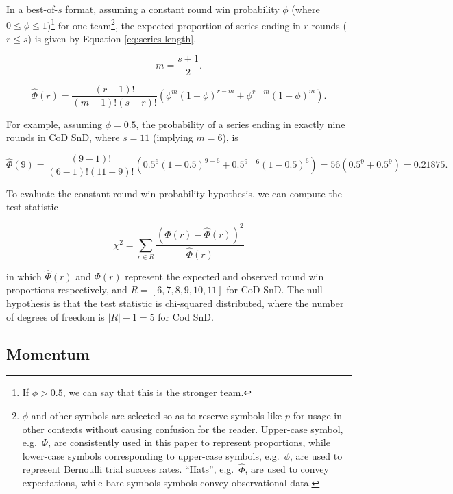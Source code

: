 \documentclass{article}
\begin{document}
In a best-of-\(s\) format, assuming a constant round win probability
\(\phi\) (where \(0 \leq \phi \leq 1\))\footnote{If \(\phi > 0.5\), we
  can say that this is the stronger team.} for one team\footnote{\(\phi\)
  and other symbols are selected so as to reserve symbols like \(p\) for
  usage in other contexts without causing confusion for the reader.
  Upper-case symbol, e.g.~\(\Phi\), are consistently used in this paper
  to represent proportions, while lower-case symbols corresponding to
  upper-case symbols, e.g.~\(\phi\), are used to represent Bernoulli
  trial success rates. ``Hats'', e.g.~\(\hat{\Phi}\), are used to convey
  expectations, while bare symbols symbols convey observational data.},
the expected proportion of series ending in \(r\) rounds (\(r \leq s\))
is given by Equation \ref{eq:series-length}.

\begin{equation}\label{eq:m}
m = \frac{s + 1}{2}.
\end{equation}

\begin{equation}\label{eq:series-length}
\hat{\Phi}(r) = \frac{(r - 1)!}{(m - 1)!(s - r)!}(\phi^{m}(1 - \phi)^{r - m} + \phi^{r - m}(1 - \phi)^m).
\end{equation}

For example, assuming \(\phi = 0.5\), the probability of a series ending
in exactly nine rounds in CoD SnD, where \(s=11\) (implying \(m=6\)), is

\[
\hat{\Phi}(9) = \frac{(9 - 1)!}{(6 - 1)!(11 - 9)!}(0.5^{6}(1 - 0.5)^{9 - 6} + 0.5^{9 - 6}(1 - 0.5)^6) = 56 (0.5^9 + 0.5^9) = 0.21875.
\]

To evaluate the constant round win probability hypothesis, we can
compute the test statistic

\begin{equation}\label{eq:chi-squ}
\chi^2 = \sum_{r \in R} \frac{(\Phi(r) - \hat{\Phi}(r))^2}{\hat{\Phi}(r)}
\end{equation}

in which \(\hat{\Phi}(r)\) and \(\Phi(r)\) represent the expected and
observed round win proportions respectively, and
\(R = [6, 7, 8, 9, 10, 11]\) for CoD SnD. The null hypothesis is that
the test statistic is chi-squared distributed, where the number of
degrees of freedom is \(\vert R \vert -1 = 5\) for Cod SnD.

\hypertarget{momentum}{%
\subsection{Momentum}\label{momentum}}
\end{document}
